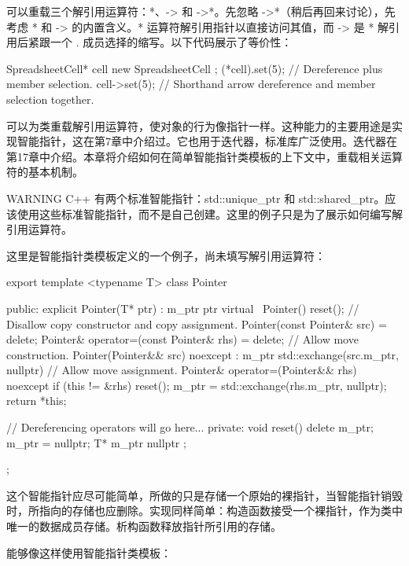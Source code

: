 
可以重载三个解引用运算符：*、-> 和 ->*。先忽略 ->*（稍后再回来讨论），先考虑 * 和 -> 的内置含义。* 运算符解引用指针以直接访问其值，而 -> 是 * 解引用后紧跟一个 . 成员选择的缩写。以下代码展示了等价性：

\begin{cpp}
SpreadsheetCell* cell { new SpreadsheetCell };
(*cell).set(5); // Dereference plus member selection.
cell->set(5); // Shorthand arrow dereference and member selection together.
\end{cpp}

可以为类重载解引用运算符，使对象的行为像指针一样。这种能力的主要用途是实现智能指针，这在第7章中介绍过。它也用于迭代器，标准库广泛使用。迭代器在第17章中介绍。本章将介绍如何在简单智能指针类模板的上下文中，重载相关运算符的基本机制。

\begin{myWarning}{WARNING}
C++ 有两个标准智能指针：std::unique\_ptr 和 std::shared\_ptr。应该使用这些标准智能指针，而不是自己创建。这里的例子只是为了展示如何编写解引用运算符。
\end{myWarning}

这里是智能指针类模板定义的一个例子，尚未填写解引用运算符：

\begin{cpp}
export template <typename T> class Pointer
{
    public:
        explicit Pointer(T* ptr) : m_ptr { ptr } {}
        virtual ~Pointer() { reset(); }
        // Disallow copy constructor and copy assignment.
        Pointer(const Pointer& src) = delete;
        Pointer& operator=(const Pointer& rhs) = delete;
        // Allow move construction.
        Pointer(Pointer&& src) noexcept : m_ptr{ std::exchange(src.m_ptr, nullptr)}
        { }
        // Allow move assignment.
        Pointer& operator=(Pointer&& rhs) noexcept
        {
            if (this != &rhs) {
                reset();
                m_ptr = std::exchange(rhs.m_ptr, nullptr);
            }
            return *this;
        }

        // Dereferencing operators will go here...
    private:
        void reset()
        {
            delete m_ptr;
            m_ptr = nullptr;
        }
        T* m_ptr { nullptr };
};
\end{cpp}

这个智能指针应尽可能简单，所做的只是存储一个原始的裸指针，当智能指针销毁时，所指向的存储也应删除。实现同样简单：构造函数接受一个裸指针，作为类中唯一的数据成员存储。析构函数释放指针所引用的存储。

能够像这样使用智能指针类模板：

